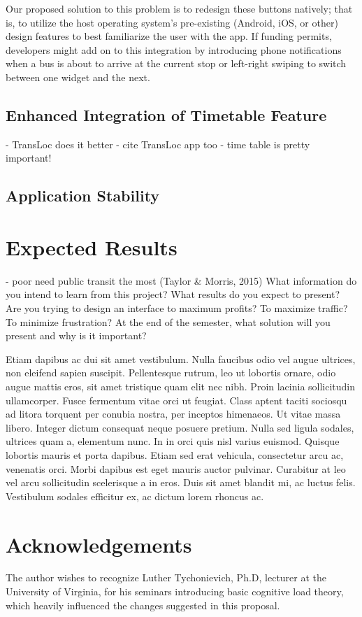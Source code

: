 \documentclass[12pt,letterpaper]{article}
\newcommand{\hl}[1] {%
{\color{red}#1}%
}
\begin{document}
Our proposed solution to this problem is to redesign these
buttons natively; that is, to utilize the host operating system's pre-existing
(Android, iOS, or other) design features to best familiarize the user with the
app. If funding permits, developers might add on to this integration by
introducing phone notifications when a bus is about to arrive at the
current stop or left-right swiping to switch between one widget and the next.

\subsection{Enhanced Integration of Timetable Feature}
 - TransLoc does it better
 - cite TransLoc app too
 - time table is pretty important!

\subsection{Application Stability}

\section{Expected Results}
\hl{ - poor need public transit the most (Taylor \& Morris, 2015)
What information do you intend to learn from this project? What results do you expect to present? Are you trying to design an interface to maximum profits? To maximize traffic? To minimize frustration? At the end of the semester, what solution will you present and why is it important?

Etiam dapibus ac dui sit amet vestibulum. Nulla faucibus odio vel augue ultrices, non eleifend sapien suscipit. Pellentesque rutrum, leo ut lobortis ornare, odio augue mattis eros, sit amet tristique quam elit nec nibh. Proin lacinia sollicitudin ullamcorper. Fusce fermentum vitae orci ut feugiat. Class aptent taciti sociosqu ad litora torquent per conubia nostra, per inceptos himenaeos. Ut vitae massa libero. Integer dictum consequat neque posuere pretium. Nulla sed ligula sodales, ultrices quam a, elementum nunc. In in orci quis nisl varius euismod. Quisque lobortis mauris et porta dapibus. Etiam sed erat vehicula, consectetur arcu ac, venenatis orci. Morbi dapibus est eget mauris auctor pulvinar. Curabitur at leo vel arcu sollicitudin scelerisque a in eros. Duis sit amet blandit mi, ac luctus felis. Vestibulum sodales efficitur ex, ac dictum lorem rhoncus ac.
}

\section{Acknowledgements}
The author wishes to recognize Luther Tychonievich, Ph.D, lecturer at the
University of Virginia, for his seminars introducing basic
cognitive load theory, which heavily influenced the changes suggested in this
proposal.
\end{document}
